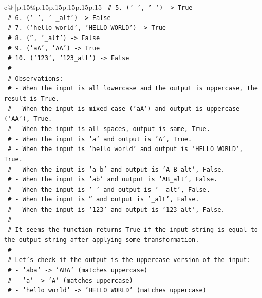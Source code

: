 \documentclass{article}
\begin{document}
{\begin{supertabular}{c@{$\;$}|p{.15\linewidth}@{}p{.15\linewidth}p{.15\linewidth}p{.15\linewidth}p{.15\linewidth}p{.15\linewidth}}
{{{\texttt{    \# 5. ('   ', '   ') {-}> True} \\
\texttt{    \# 6. (' ', ' \_alt') {-}> False} \\
\texttt{    \# 7. ('hello world', 'HELLO WORLD') {-}> True} \\
\texttt{    \# 8. ('', '\_alt') {-}> False} \\
\texttt{    \# 9. ('aA', 'AA') {-}> True} \\
\texttt{    \# 10. ('123', '123\_alt') {-}> False} \\
\texttt{    \#} \\
\texttt{    \# Observations:} \\
\texttt{    \# {-} When the input is all lowercase and the output is uppercase, the result is True.} \\
\texttt{    \# {-} When the input is mixed case ('aA') and output is uppercase ('AA'), True.} \\
\texttt{    \# {-} When the input is all spaces, output is same, True.} \\
\texttt{    \# {-} When the input is 'a' and output is 'A', True.} \\
\texttt{    \# {-} When the input is 'hello world' and output is 'HELLO WORLD', True.} \\
\texttt{    \# {-} When the input is 'a{-}b' and output is 'A{-}B\_alt', False.} \\
\texttt{    \# {-} When the input is 'ab' and output is 'AB\_alt', False.} \\
\texttt{    \# {-} When the input is ' ' and output is ' \_alt', False.} \\
\texttt{    \# {-} When the input is '' and output is '\_alt', False.} \\
\texttt{    \# {-} When the input is '123' and output is '123\_alt', False.} \\
\texttt{    \#} \\
\texttt{    \# It seems the function returns True if the input string is equal to the output string after applying some transformation.} \\
\texttt{    \#} \\
\texttt{    \# Let's check if the output is the uppercase version of the input:} \\
\texttt{    \# {-} 'aba' {-}> 'ABA' (matches uppercase)} \\
\texttt{    \# {-} 'a' {-}> 'A' (matches uppercase)} \\
\texttt{    \# {-} 'hello world' {-}> 'HELLO WORLD' (matches uppercase)} \\
}}}
\end{supertabular}}
\end{document}

